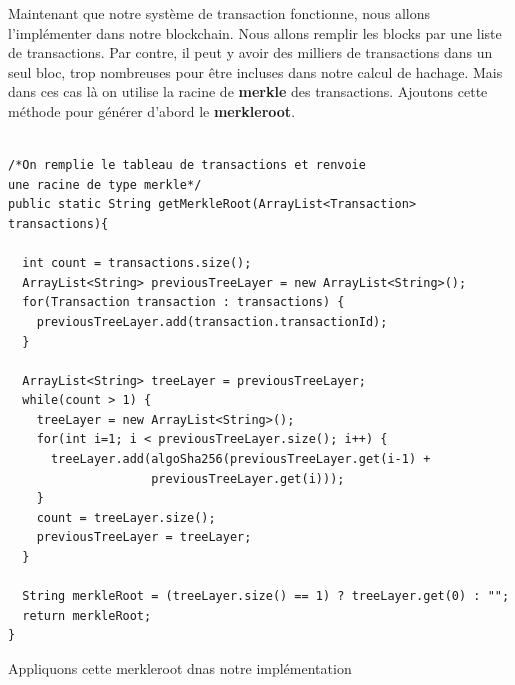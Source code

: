 \documentclass[12pt]{report}
\begin{document}
\hspace{1cm} Maintenant que notre système de transaction fonctionne, nous allons l'implémenter dans notre blockchain. Nous allons remplir les blocks par une liste de transactions. Par contre, il peut y avoir des milliers de transactions dans un seul bloc, trop nombreuses pour être incluses dans notre calcul de hachage. Mais dans ces cas là on utilise la racine de \textbf{merkle} des transactions. Ajoutons cette méthode pour générer d'abord le \textbf{merkleroot}.

\begin{lstlisting}

/*On remplie le tableau de transactions et renvoie 
une racine de type merkle*/
public static String getMerkleRoot(ArrayList<Transaction> transactions){

  int count = transactions.size();
  ArrayList<String> previousTreeLayer = new ArrayList<String>();
  for(Transaction transaction : transactions) {
    previousTreeLayer.add(transaction.transactionId);
  }
  
  ArrayList<String> treeLayer = previousTreeLayer;
  while(count > 1) {
    treeLayer = new ArrayList<String>();
    for(int i=1; i < previousTreeLayer.size(); i++) {
      treeLayer.add(algoSha256(previousTreeLayer.get(i-1) + 
                    previousTreeLayer.get(i)));
    }
    count = treeLayer.size();
    previousTreeLayer = treeLayer;
  }
  
  String merkleRoot = (treeLayer.size() == 1) ? treeLayer.get(0) : "";
  return merkleRoot;
}

\end{lstlisting}
Appliquons cette merkleroot dnas notre implémentation
\end{document}

